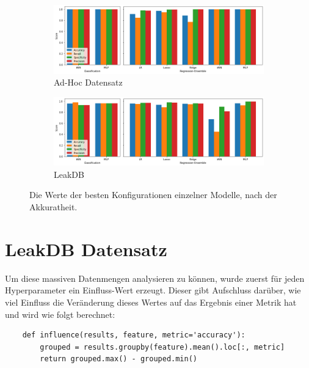 \begin{figure}[ht]
    \centering
    \begin{subfigure}{\textwidth}
        \includegraphics[width=1.0\textwidth]{res/res-best-adhoc}
        \caption{Ad-Hoc Datensatz\vspace{1em}}
        \label{fig:res-best-adhoc}
    \end{subfigure}
    \begin{subfigure}{\textwidth}
        \includegraphics[width=1.0\textwidth]{res/res-best-leakdb}
        \caption{LeakDB}
        \label{fig:res-best-leakdb}
    \end{subfigure}
    \caption{Die Werte der besten Konfigurationen einzelner Modelle, nach der Akkuratheit.}
\end{figure}

\section{LeakDB Datensatz}

Um diese massiven Datenmengen analysieren zu können, wurde zuerst für jeden Hyperparameter ein Einfluss-Wert
 erzeugt. Dieser gibt Aufschluss darüber, wie viel Einfluss die Veränderung dieses Wertes auf das Ergebnis
 einer Metrik hat und wird wie folgt berechnet:

\begin{verbatim}
    def influence(results, feature, metric='accuracy'):
        grouped = results.groupby(feature).mean().loc[:, metric]
        return grouped.max() - grouped.min()
\end{verbatim}

